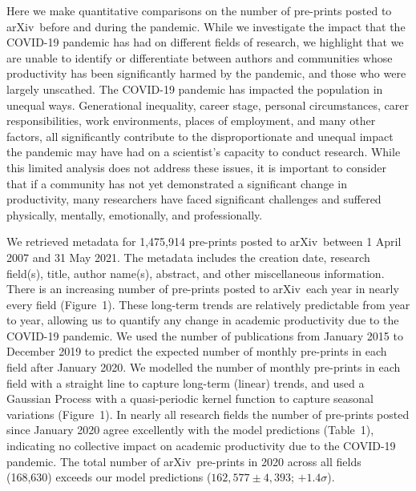 \documentclass[a4paper,12pt]{article}
\newcommand{\arxiv}{arXiv}
\begin{document}
Here we make quantitative comparisons on the number of pre-prints posted to \arxiv\ before and during the pandemic. While we investigate the impact that the COVID-19 pandemic has had on different fields of research, we highlight that we are unable to identify or differentiate between authors and communities whose productivity has been significantly harmed by the pandemic, and those who were largely unscathed. The COVID-19 pandemic has impacted the population in unequal ways\cite{Nicola:2020,Chu:2020,Viglione:2020,Gewen:2020,IbnMohammed:2021,King:2021}. Generational inequality, career stage, personal circumstances, carer responsibilities, work environments, places of employment, and many other factors, all significantly contribute to the disproportionate and unequal impact the pandemic may have had on a scientist's capacity to conduct research. While this limited analysis does not address these issues, it is important to consider that if a community has not yet demonstrated a significant change in productivity, many researchers have faced significant challenges and suffered physically, mentally, emotionally, and professionally. 


We retrieved metadata for 1,475,914 pre-prints posted to \arxiv\ between 1 April 2007 and 31 May 2021. The metadata includes the creation date, research field(s), title, author name(s), abstract, and other miscellaneous information\cite{Clement:2019}. There is an increasing number of pre-prints posted to \arxiv\ each year in nearly every field (Figure~1). These long-term trends are relatively predictable from year to year, allowing us to quantify any change in academic productivity due to the COVID-19 pandemic. We used the number of publications from January 2015 to December 2019 to predict the expected number of monthly pre-prints in each field after January 2020. We modelled the number of monthly pre-prints in each field with a straight line to capture long-term (linear) trends, and used a Gaussian Process with a quasi-periodic kernel function\cite{Rasmussen:2006,Ambikasaran:2014} to capture seasonal variations (Figure~1). In nearly all research fields the number of pre-prints posted since January 2020 agree excellently with the model predictions (Table~1), indicating no collective impact on academic productivity due to the COVID-19 pandemic. The total number of \arxiv\ pre-prints in 2020 across all fields (168,630) exceeds our model predictions ($162{,}577 \pm 4{,}393$; $+1.4\sigma$). 
\end{document}
